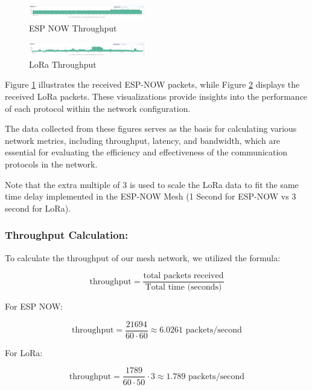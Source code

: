 \begin{figure}[H]
  \begin{center}
    \includegraphics[width=0.45\textwidth]{./Figures/elk/espnow.png}
  \end{center}
  \caption{ESP NOW Throughput}\label{fig:espnowthroughput}
\end{figure}

\begin{figure}[H]
  \begin{center}
    \includegraphics[width=0.45\textwidth]{./Figures/elk/lora.png}
  \end{center}
  \caption{LoRa Throughput}\label{fig:lorathroughput}
\end{figure}

Figure \ref{fig:espnowthroughput} illustrates the received ESP-NOW packets, while Figure \ref{fig:lorathroughput} displays the received LoRa packets. These visualizations provide insights into the performance of each protocol within the network configuration.

The data collected from these figures serves as the basis for calculating various network metrics, including throughput, latency, and bandwidth, which are essential for evaluating the efficiency and effectiveness of the communication protocols in the network.

Note that the extra multiple of 3 is used to scale the LoRa data to fit the same time delay implemented in the ESP-NOW Mesh (1 Second for ESP-NOW vs 3 second for LoRa).

\subsubsection{Throughput Calculation:}

To calculate the throughput of our mesh network, we utilized the formula:

\[
\text{throughput} = \frac{\text{total packets received}}{\text{Total time (seconds)}}
\]

For ESP NOW:

\[
\text{throughput} = \frac{21694}{60 \cdot 60} \approx 6.0261 \text{ packets/second}
\]

For LoRa:

\[
\text{throughput} = \frac{1789}{60 \cdot 50} \cdot 3 \approx 1.789 \text{ packets/second}
\]

